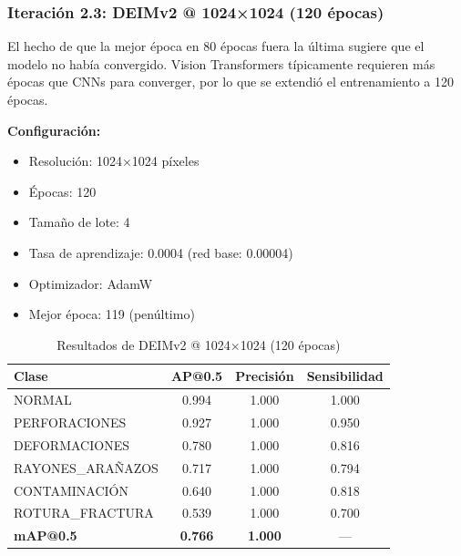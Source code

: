\subsubsection{Iteración 2.3: DEIMv2 @ 1024×1024 (120 épocas)}
\label{sec:iteracion-deimv2-120ep}

El hecho de que la mejor época en 80 épocas fuera la última sugiere que el modelo no había convergido. Vision Transformers típicamente requieren más épocas que CNNs para converger, por lo que se extendió el entrenamiento a 120 épocas.

\textbf{Configuración:}
\begin{itemize}
    \item Resolución: 1024×1024 píxeles
    \item Épocas: 120
    \item Tamaño de lote: 4
    \item Tasa de aprendizaje: 0.0004 (red base: 0.00004)
    \item Optimizador: AdamW
    \item Mejor época: 119 (penúltimo)
\end{itemize}

\begin{table}[htbp]
\centering
\begin{tabular}{lccc}
\toprule
\textbf{Clase} & \textbf{AP@0.5} & \textbf{Precisión} & \textbf{Sensibilidad} \\
\midrule
NORMAL & 0.994 & 1.000 & 1.000 \\
PERFORACIONES & 0.927 & 1.000 & 0.950 \\
DEFORMACIONES & 0.780 & 1.000 & 0.816 \\
\mbox{RAYONES\_ARAÑAZOS} & 0.717 & 1.000 & 0.794 \\
CONTAMINACIÓN & 0.640 & 1.000 & 0.818 \\
\mbox{ROTURA\_FRACTURA} & 0.539 & 1.000 & 0.700 \\
\midrule
\textbf{mAP@0.5} & \textbf{0.766} & \textbf{1.000} & --- \\
\bottomrule
\end{tabular}
\caption{Resultados de DEIMv2 @ 1024×1024 (120 épocas)}
\label{tab:deimv2_1024_120ep}
\end{table}

